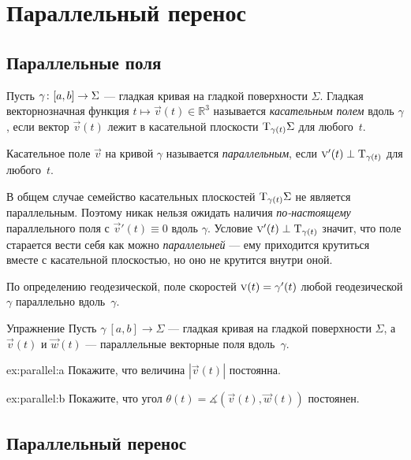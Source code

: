 \chapter{Параллельный перенос}
\label{chap:parallel-transport}

\section{Параллельные поля}

Пусть $\gamma\:[a,b]\z\to \Sigma$ --- гладкая кривая на гладкой поверхности $\Sigma$.
Гладкая векторнозначная функция $t\mapsto {\vec v}(t) \in \mathbb{R}^3$ называется \emph{касательным полем} вдоль $\gamma$, если
вектор ${\vec v}(t)$ лежит в касательной плоскости $\mathrm{T}_{\gamma(t)}\Sigma$ для любого~$t$.

Касательное поле ${\vec v}$ на кривой $\gamma$ называется \emph{параллельным}, если ${\text{\sc{v}}}'(t)\perp\mathrm{T}_{\gamma(t)}$ для любого~$t$.

В общем случае семейство касательных плоскостей $\mathrm{T}_{\gamma(t)}\Sigma$ не является параллельным.
Поэтому никак нельзя ожидать наличия \textit{по-настоящему} параллельного поля с ${\vec v}'(t)\equiv 0$ вдоль $\gamma$.
Условие ${\vec v}'(t)\z\perp\T_{\gamma(t)}$ значит, что поле старается вести себя как можно \textit{параллельней} --- ему приходится крутиться вместе с касательной плоскостью, но оно не крутится внутри оной.

По определению геодезической, поле скоростей ${\vec v}(t)\z=\gamma'(t)$ любой геодезической $\gamma$  параллельно вдоль~$\gamma$.

\begin{thm}{Упражнение}\label{ex:parallel}
Пусть $\gamma\:[a,b]\to \Sigma$ --- гладкая кривая на гладкой поверхности $\Sigma$, а ${\vec v}(t)$ и $\vec w(t)$ --- параллельные векторные поля вдоль~$\gamma$.

\begin{subthm}{ex:parallel:a}
Покажите, что величина $|{\vec v}(t)|$ постоянна.
\end{subthm}

\begin{subthm}{ex:parallel:b}
Покажите, что угол $\theta(t)=\measuredangle({\vec v}(t),\vec w(t))$ постоянен.
\end{subthm}

\end{thm}


\section{Параллельный перенос}

